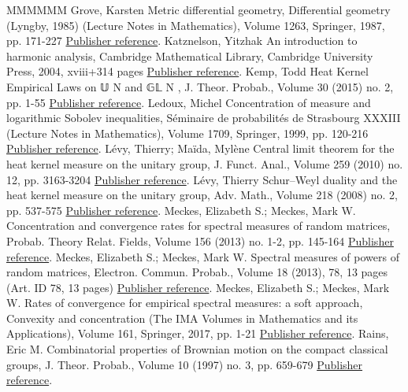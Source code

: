 \documentclass[11pt]{article}
\theoremstyle{definition}
\numberwithin{equation}{section}
\numberwithin{figure}{section}
\numberwithin{table}{section}
\begin{document}
\begin{thebibliography}{MMMMMM}
 Grove, Karsten Metric differential geometry, Differential geometry (Lyngby, 1985) (Lecture Notes in Mathematics), Volume 1263, Springer, 1987, pp. 171-227 \href{https://ahl.centre-mersenne.org/item/AHL_2018__1__247_0/#Grove1987}{Publisher reference}.
 Katznelson, Yitzhak An introduction to harmonic analysis, Cambridge Mathematical Library, Cambridge University Press, 2004, xviii+314 pages \href{https://ahl.centre-mersenne.org/item/AHL_2018__1__247_0/#Katznelson2004}{Publisher reference}.
 Kemp, Todd Heat Kernel Empirical Laws on 𝕌 N  and 𝔾𝕃 N , J. Theor. Probab., Volume 30 (2015) no. 2, pp. 1-55 \href{https://ahl.centre-mersenne.org/item/AHL_2018__1__247_0/#Kemp2015}{Publisher reference}.
 Ledoux, Michel Concentration of measure and logarithmic Sobolev inequalities, Séminaire de probabilités de Strasbourg XXXIII (Lecture Notes in Mathematics), Volume 1709, Springer, 1999, pp. 120-216 \href{https://ahl.centre-mersenne.org/item/AHL_2018__1__247_0/#Ledoux1999}{Publisher reference}.
 Lévy, Thierry; Maïda, Mylène Central limit theorem for the heat kernel measure on the unitary group, J. Funct. Anal., Volume 259 (2010) no. 12, pp. 3163-3204 \href{https://ahl.centre-mersenne.org/item/AHL_2018__1__247_0/#LevyMaida2010}{Publisher reference}.
 Lévy, Thierry Schur–Weyl duality and the heat kernel measure on the unitary group, Adv. Math., Volume 218 (2008) no. 2, pp. 537-575 \href{https://ahl.centre-mersenne.org/item/AHL_2018__1__247_0/#Levy2008}{Publisher reference}.
 Meckes, Elizabeth S.; Meckes, Mark W. Concentration and convergence rates for spectral measures of random matrices, Probab. Theory Relat. Fields, Volume 156 (2013) no. 1-2, pp. 145-164 \href{https://ahl.centre-mersenne.org/item/AHL_2018__1__247_0/#MM-PTRF-2013}{Publisher reference}.
 Meckes, Elizabeth S.; Meckes, Mark W. Spectral measures of powers of random matrices, Electron. Commun. Probab., Volume 18 (2013), 78, 13 pages (Art. ID 78, 13 pages) \href{https://ahl.centre-mersenne.org/item/AHL_2018__1__247_0/#MM-ECP-2013}{Publisher reference}.
 Meckes, Elizabeth S.; Meckes, Mark W. Rates of convergence for empirical spectral measures: a soft approach, Convexity and concentration (The IMA Volumes in Mathematics and its Applications), Volume 161, Springer, 2017, pp. 1-21 \href{https://ahl.centre-mersenne.org/item/AHL_2018__1__247_0/#MM2016}{Publisher reference}.
 Rains, Eric M. Combinatorial properties of Brownian motion on the compact classical groups, J. Theor. Probab., Volume 10 (1997) no. 3, pp. 659-679 \href{https://ahl.centre-mersenne.org/item/AHL_2018__1__247_0/#Rains1997}{Publisher reference}.

\end{thebibliography}
\end{document}
